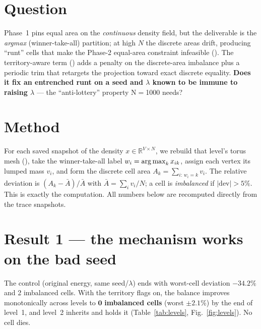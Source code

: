 \documentclass[11pt,a4paper]{article}
\begin{document}
\section{Question}
Phase~1 pins equal area on the \emph{continuous} density field, but the deliverable is
the \emph{argmax} (winner-take-all) partition; at high \(N\) the discrete areas drift,
producing ``runt'' cells that make the Phase-2 equal-area constraint infeasible
(). The territory-aware
term () adds a penalty on the discrete-area
imbalance plus a periodic trim that retargets the projection toward exact discrete
equality. \textbf{Does it fix an entrenched runt on a seed and \(\lambda\) known to be
immune to raising \(\lambda\)} --- the ``anti-lottery'' property N\(=\)1000 needs?

\section{Method}
For each saved snapshot of the density \(x\in\mathbb{R}^{V\times N}\), we rebuild that level's
torus mesh (), take the winner-take-all label
\(w_i=\operatorname*{arg\,max}_k x_{ik}\), assign each vertex its lumped mass \(v_i\), and form the
discrete cell area \(A_k=\sum_{i:\,w_i=k} v_i\). The relative deviation is
\((A_k-\bar A)/\bar A\) with \(\bar A=\sum_i v_i/N\); a cell is \emph{imbalanced} if
\(|\text{dev}|>5\%\). This is exactly the  computation.
All numbers below are recomputed directly from the trace snapshots.

\section{Result 1 --- the mechanism works on the bad seed}
The control (original energy, same seed/\(\lambda\)) ends with worst-cell deviation
\(-34.2\%\) and 2 imbalanced cells. With the territory flags on, the balance improves
monotonically across levels to \(\mathbf{0}\) \textbf{imbalanced cells} (worst
\(\pm2.1\%\)) by the end of level~1, and level~2 inherits and holds it
(Table~\ref{tab:levels}, Fig.~\ref{fig:levels}). No cell dies.
\end{document}
